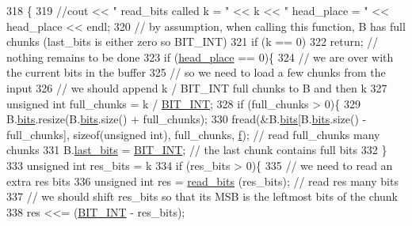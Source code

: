 \begin{DoxyCode}
318                                                    \{
319   \textcolor{comment}{//cout << " read\_bits called k = " << k << " head\_place = " << head\_place << endl;}
320   \textcolor{comment}{// by assumption, when calling this function, B has full chunks (last\_bits is either zero so BIT\_INT)}
321   \textcolor{keywordflow}{if} (k == 0)
322     \textcolor{keywordflow}{return}; \textcolor{comment}{// nothing remains to be done}
323   \textcolor{keywordflow}{if} (\hyperlink{classibitstream_a7b96359ac1534a5565e6e9b0cc53a0b3}{head\_place} == 0)\{
324     \textcolor{comment}{// we are over with the current bits in the buffer}
325     \textcolor{comment}{// so we need to load a few chunks from the input}
326     \textcolor{comment}{// we should append k / BIT\_INT full chunks to B and then k %
327     \textcolor{keywordtype}{unsigned} \textcolor{keywordtype}{int} full\_chunks = k / \hyperlink{bitstream_8h_afcadf5aa65c5159bfb96c4d82ebc0a5d}{BIT\_INT};
328     \textcolor{keywordflow}{if} (full\_chunks > 0)\{
329       B.\hyperlink{classbit__pipe_a86f38af1e9736b053728033490476b50}{bits}.resize(B.\hyperlink{classbit__pipe_a86f38af1e9736b053728033490476b50}{bits}.size() + full\_chunks);
330       fread(&B.\hyperlink{classbit__pipe_a86f38af1e9736b053728033490476b50}{bits}[B.\hyperlink{classbit__pipe_a86f38af1e9736b053728033490476b50}{bits}.size() - full\_chunks], \textcolor{keyword}{sizeof}(\textcolor{keywordtype}{unsigned} int), full\_chunks, 
      \hyperlink{classibitstream_a3ea2cdd0cf97820f0e1520c42e364308}{f}); \textcolor{comment}{// read full\_chunks many chunks}
331       B.\hyperlink{classbit__pipe_a0f3e84b02751803adaab499b5dad86fe}{last\_bits} = \hyperlink{bitstream_8h_afcadf5aa65c5159bfb96c4d82ebc0a5d}{BIT\_INT}; \textcolor{comment}{// the last chunk contains full bits }
332     \}
333     \textcolor{keywordtype}{unsigned} \textcolor{keywordtype}{int} res\_bits = k %
334     \textcolor{keywordflow}{if} (res\_bits > 0)\{
335       \textcolor{comment}{// we need to read an extra res bits}
336       \textcolor{keywordtype}{unsigned} \textcolor{keywordtype}{int} res = \hyperlink{classibitstream_a2fdcaecf10fefa6942dcd5286a2696e0}{read\_bits} (res\_bits); \textcolor{comment}{// read res many bits}
337       \textcolor{comment}{// we should shift res\_bits so that its MSB is the leftmost bits of the chunk}
338       res <<= (\hyperlink{bitstream_8h_afcadf5aa65c5159bfb96c4d82ebc0a5d}{BIT\_INT} - res\_bits);
}
\end{DoxyCode}
